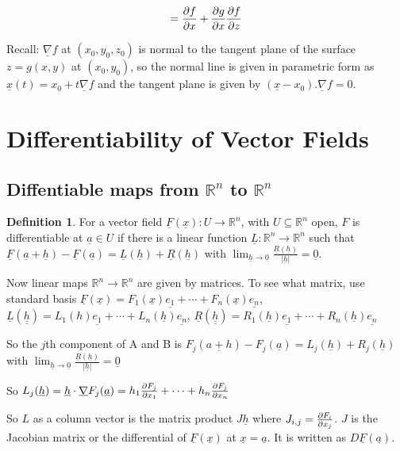 \documentclass[12pt,a4paper]{article}
\theoremstyle{definition}
\newtheorem{definition}{Definition}[subsection]
\begin{document}
\[= \diffp{f}{x} + \diffp{g}{x}\diffp{f}{z}\]

Recall: $\underline{\nabla} f$ at $(x_0, y_0, z_0)$ is normal to the tangent plane of the surface $z = g(x, y)$ at $(x_0, y_0)$, so the normal line is given in parametric form as $\underline{x}(t) = x_0 + t \underline{\nabla} f$ and the tangent plane is given by $(\underline{x} - x_0) . \underline{\nabla} f = 0$.

\section{Differentiability of Vector Fields}

\subsection{Diffentiable maps from $\mathbb{R}^n$ to $\mathbb{R}^n$}

\begin{definition}
	For a vector field $\underline{F}(\underline{x}): U \rightarrow \mathbb{R}^n$, with $U \subseteq \mathbb{R}^n$ open, $F$ is differentiable at $\underline{a} \in U$ if there is a linear function $\underline{L}: \mathbb{R}^n \rightarrow \mathbb{R}^n$ such that $\underline{F}(\underline{a} + \underline{h}) - \underline{F}(\underline{a}) = \underline{L}(\underline{h}) + \underline{R}(\underline{h})$ with $\lim_{\underline{h} \rightarrow \underline{0}} \frac{\underline{R}(\underline{h})}{|\underline{h}|} = \underline{0}$.

	Now linear maps $\mathbb{R}^n \rightarrow \mathbb{R}^n$ are given by matrices. To see what matrix, use standard basis $\underline{F}(\underline{x}) = F_1(\underline{x}) \underline{e_1} + \cdots + F_n(\underline{x}) \underline{e_n}$, $\underline{L}(\underline{\underline{h}}) = L_1(h) \underline{e_1} + \cdots + L_n(\underline{h}) \underline{e_n}$, $\underline{R}(\underline{\underline{h}}) = R_1(\underline{h}) \underline{e_1} + \cdots + R_n(\underline{h}) \underline{e_n}$

	So the $j$th component of A and B is $F_j(\underline{a + h}) - F_j(\underline{a}) = L_j(\underline{h}) + R_j(\underline{h})$ with $\lim_{\underline{h} \rightarrow \underline{0}} \frac{\underline{R}(\underline{h})}{|\underline{h}|} = \underline{0}$

	So $L_j(\underline{h}) = \underline{h} \cdot \underline{\nabla} F_j(\underline{a}) = h_1 \diffp{F_j}{x_1} + \cdots + h_n \diffp{F_j}{x_n}$

	So $L$ as a column vector is the matrix product $J \underline{h}$ where $J_{i, j} = \diffp{F_i}{x_j}$. $J$ is the Jacobian matrix or the differential of $\underline{F}(\underline{x})$ at $\underline{x} = \underline{a}$. It is written as $D\underline{F}(\underline{a})$.
\end{definition}
\end{document}
